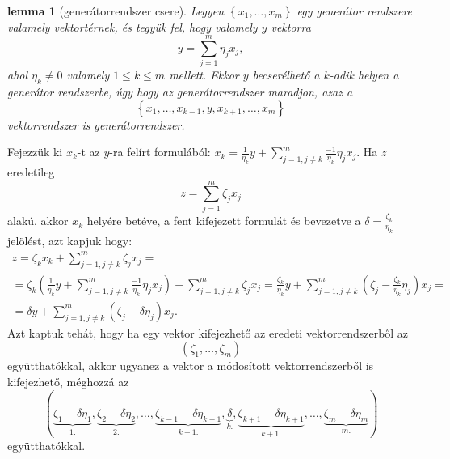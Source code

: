 \documentclass[9pt,showtrims]{memoir}
\makeatletter
\renewenvironment{proof}[1][\proofname]
    {\par\pushQED{\qed}%
    \normalfont \topsep6\p@\@plus6\p@\relax
    \trivlist
    \item[\hskip\labelsep
        \itshape
    #1\@addpunct{:}]\ignorespaces}
    {\popQED\endtrivlist\@endpefalse}
\theoremstyle{plain}
\newtheorem{lemma}[proposition]{lemma}
\theoremstyle{remark}
\theoremstyle{definition}
\makeatother
\begin{document}
\begin{lemma}[generátorrendszer csere]
    Legyen $\left\{ x_1,\dots,x_m \right\}$ egy generátor rendszere valamely vektortérnek,
    és tegyük fel, hogy valamely $y$ vektorra
    \[
        y=\sum_{j=1}^m\eta_jx_j,
    \]
    ahol $\eta_k\neq 0$ valamely $1\leq k\leq m$ mellett. 
    Ekkor $y$ becserélhető a $k$-adik helyen a generátor rendszerbe, 
    úgy hogy az generátorrendszer maradjon, azaz a
    \[
        \left\{ x_1,\dots,x_{k-1},y,x_{k+1},\dots,x_m \right\}
    \]
    vektorrendszer is generátorrendszer.
    \label{le:gencsere}
\end{lemma}
\begin{proof}
    Fejezzük ki $x_k$-t az $y$-ra felírt formulából:
    \(
    x_k=\frac{1}{\eta_k}y+\sum_{j=1,j\neq k}^m\frac{-1}{\eta_k}\eta_jx_j.
    \)
    Ha $z$ eredetileg 
    \[
        z=\sum_{j=1}^m\zeta_jx_j
    \]
    alakú, akkor $x_k$ helyére betéve, a fent kifejezett formulát és bevezetve a 
    $\delta=\frac{\zeta_k}{\eta_k}$ jelölést, azt kapjuk hogy:
    \begin{multline*}
        z=\zeta_kx_k+\sum_{j=1,j\neq k}^m\zeta_jx_j=
        \\
        =
        \zeta_k
        \left( 
        \frac{1}{\eta_k}y+\sum_{j=1,j\neq k}^m\frac{-1}{\eta_k}\eta_jx_j
        \right)
        +\sum_{j=1,j\neq k}^m\zeta_jx_j
        =
        \frac{\zeta_k}{\eta_k}y+
        \sum_{j=1,j\neq k}^m\left( \zeta_j-\frac{\zeta_k}{\eta_k}\eta_j \right)x_j=
        \\
        =\delta y+
        \sum_{j=1,j\neq k}^m\left( \zeta_j-\delta\eta_j \right)x_j.
    \end{multline*}
    Azt kaptuk tehát, hogy ha egy vektor kifejezhető az eredeti vektorrendszerből az 
    \[
        \left( \zeta_1,\dots,\zeta_m \right) 
    \]
    együtthatókkal, akkor ugyanez a vektor a módosított vektorrendszerből is kifejezhető,
    méghozzá az 
    \[
        \left( 
        \underbrace{\zeta_1-\delta\eta_1}_{1.},
        \underbrace{\zeta_2-\delta\eta_2}_{2.},
        \dots,
        \underbrace{\zeta_{k-1}-\delta\eta_{k-1}}_{k-1.},
        \underbrace{\delta}_{k.},
        \underbrace{\zeta_{k+1}-\delta\eta_{k+1}}_{k+1.},\dots,
        \underbrace{\zeta_m-\delta\eta_m}_{m.}
        \right)
    \]
    együtthatókkal.
\end{proof}
\end{document}
